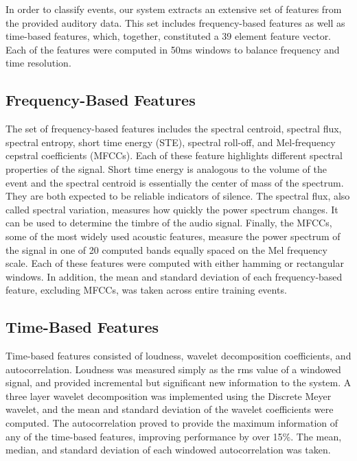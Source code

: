 In order to classify events, our system extracts an extensive set of features from the provided auditory data. This set includes frequency-based features as well as time-based features, which, together, constituted a 39 element feature vector. Each of the features were computed in 50ms windows to balance frequency and time resolution.

\subsection{Frequency-Based Features}
The set of frequency-based features includes the spectral centroid, spectral flux, spectral entropy, short time energy (STE), spectral roll-off, and Mel-frequency cepstral coefficients (MFCCs). Each of these feature highlights different spectral properties of the signal. Short time energy is analogous to the volume of the event and the spectral centroid is essentially the center of mass of the spectrum. They are both expected to be reliable indicators of
silence. The spectral flux, also called spectral variation, measures how quickly the power spectrum changes. It can be used to determine the timbre of the audio signal. Finally, the MFCCs, some of the most widely used acoustic features, measure the power spectrum of the signal in one of 20 computed bands equally spaced on the Mel frequency scale. Each of these features were computed with either hamming or rectangular windows. In addition, the mean and standard
deviation of each frequency-based feature, excluding MFCCs, was taken across entire training events.

\subsection{Time-Based Features}
Time-based features consisted of loudness, wavelet decomposition coefficients, and autocorrelation. Loudness was measured simply as the rms value of a windowed signal, and provided incremental but significant new information to the system. A three layer wavelet decomposition was implemented using the Discrete Meyer wavelet, and the mean and standard deviation of the wavelet coefficients were computed. The autocorrelation proved to provide the maximum information of any
of the time-based features, improving performance by over 15\%. The mean, median, and standard deviation of each windowed autocorrelation was taken.
